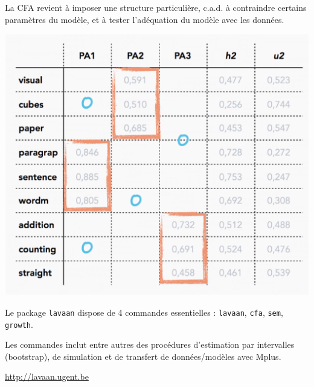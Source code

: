 
La CFA revient à imposer une structure particulière, c.a.d. à contraindre certains
paramètres du modèle, et à tester l'adéquation du modèle avec les données.

{\centering \includegraphics[width=.4\textwidth]{figs/cfa.eps}\par}


Le package \texttt{lavaan}\autocite{rosseel12} dispose de 4 commandes essentielles :
\texttt{lavaan}, \texttt{cfa}, \texttt{sem}, \texttt{growth}.

Les commandes inclut entre autres des procédures d'estimation par intervalles
(bootstrap), de simulation et de transfert de données/modèles avec
Mplus\autocite{beaujean13,beaujean14}.

{\centering \url{http://lavaan.ugent.be}\par}



